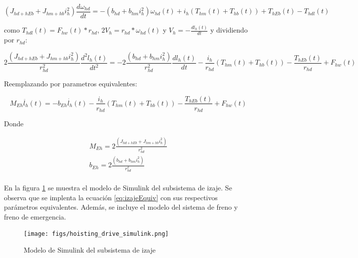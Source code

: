 \documentclass{article}
\begin{document}
            \begin{equation} \label{eq:izajeThdl}
                (J_{hd+hEb} + J_{hm+hb} i_h^2) \frac{d \omega_{hd}}{dt} = - (b_{hd} + b_{hm}i_h^2) \omega_{hd}(t) + i_h (T_{hm}(t) + T_{hb}(t)) + T_{hEb}(t) - T_{hdl}(t)
            \end{equation}

            como $T_{hdl}(t) = F_{hw}(t)*r_{hd}$, $2V_h = r_{hd}*\omega_{hd}(t)$ y $V_h = -\frac{dl_h(t)}{dt}$ y dividiendo por $r_{hd}$:

            \begin{equation} \label{eq:izajeFhw}
                2\frac{(J_{hd+hEb} + J_{hm+hb} i_h^2)}{r_{hd}^2} \frac{d^2 l_h(t)}{dt^2} = - 2\frac{(b_{hd} + b_{hm}i_h^2)}{r_{hd}^2} \frac{d l_h(t)}{dt} - \frac{i_h}{r_{hd}} (T_{hm}(t) + T_{hb}(t)) - \frac{T_{hEb}(t)}{r_{hd}} + F_{hw}(t)
            \end{equation}
            
            Reemplazando por parametros equivalentes:
            
            \begin{equation} \label{eq:izajeEquiv}
                M_{Eh} \ddot{l_h}(t) = - b_{Eh} \dot{l_h}(t) - \frac{i_h}{r_{hd}} (T_{hm}(t) + T_{hb}(t)) - \frac{T_{hEb}(t)}{r_{hd}} + F_{hw}(t)
            \end{equation}

            Donde

            \begin{align} \label{eq:izajeParamsEquiv}
                M_{Eh} = 2\frac{(J_{hd+hEb} + J_{hm+hb} i_h^2)}{r_{hd}^2}\\
                b_{Eh} = 2\frac{(b_{hd} + b_{hm}i_h^2)}{r_{hd}^2}\\
            \end{align}

            En la figura \ref{fig:hoisting_drive_simulink} se muestra el modelo de Simulink del subsistema de izaje. Se observa que se implenta la ecuación \ref{eq:izajeEquiv} con sus respectivos parámetros equivalentes. Además, se incluye el modelo del sistema de freno y freno de emergencia. 

            \begin{figure} [H]
                \centering
                \texttt{[image: figs/hoisting\_drive\_simulink.png]}
                \caption{Modelo de Simulink del subsistema de izaje}
                \label{fig:hoisting_drive_simulink}
            \end{figure}
\end{document}
